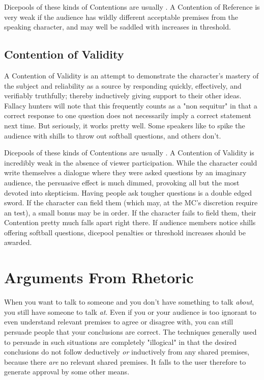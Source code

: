 Dicepools of these kinds of Contentions are usually . A Contention of Reference is very weak if the audience has wildly different acceptable premises from the speaking character, and may well be saddled with increases in threshold.

\subsection{Contention of Validity}

A Contention of Validity is an attempt to demonstrate the character's mastery of the subject and reliability as a source by responding quickly, effectively, and verifiably truthfully; thereby inductively giving support to their other ideas. Fallacy hunters will note that this frequently counts as a "non sequitur" in that a correct response to one question does not necessarily imply a correct statement next time. But seriously, it works pretty well. Some speakers like to spike the audience with shills to throw out softball questions, and others don't. 

Dicepools of these kinds of Contentions are usually . A Contention of Validity is incredibly weak in the absence of viewer participation. While the character could write themselves a dialogue where they were asked questions by an imaginary audience, the persuasive effect is much dimmed, provoking all but the most devoted into skepticism. Having people ask tougher questions is a double edged sword. If the character can field them (which may, at the MC's discretion require an  test), a small bonus may be in order. If the character fails to field them, their Contention pretty much falls apart right there. If audience members notice shills offering softball questions, dicepool penalties or threshold increases should be awarded.

\section{Arguments From Rhetoric}

When you want to talk to someone and you don't have something to talk \textit{about}, you still have someone to talk \textit{at}. Even if you or your audience is too ignorant to even understand relevant premises to agree or disagree with, you can still persuade people that your conclusions are correct. The techniques generally used to persuade in such situations are completely "illogical" in that the desired conclusions do not follow deductively \textit{or} inductively from any shared premises, because there \textit{are} no relevant shared premises. It falls to the user therefore to generate approval by some other means.


